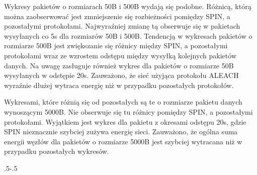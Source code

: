 Wykresy pakietów o rozmiarach 50B i 500B wydają się podobne. Różnicą, którą można zaobserwować jest zmniejszenie się rozbieżności pomiędzy SPIN, a pozostałymi protokołami. Najwyraźniej zmianę tą obserwuje się w pakietach wysyłanych co 5s dla rozmiarów 50B i 500B. Tendencją w wykresach pakietów o rozmiarze 500B jest zwiększanie się różnicy między SPIN, a pozostałymi protokołami wraz ze wzrostem odstępu między wysyłką kolejnych pakietów danych. Na uwagę zasługuje również wykres dla pakietów o rozmiarze 50B wysyłanych w odstępie 20s. Zauważono, że sieć użyjąca protokołu ALEACH wyraźnie dłużej wytraca energię niż w przypadku pozostałych protokołów. 

Wykresami, które różnią się od pozostałych są te o rozmiarze pakietu danych wynoszącym 5000B. Nie obserwuje się tu różnicy pomiędzy SPIN, a pozostałymi protokołami. Wyjątkiem jest wykres dla pakietu z okresami odstępu 20s, gdzie SPIN nieznacznie szybciej zużywa energię sieci. Zauważono, że ogólna suma energii węzłów dla pakietów o rozmiarze 5000B jest szybciej wytracana niż w przypadku pozostałych wykresów.

\clearpage
\thispagestyle{empty}

{\pdfpagewidth
    \vspace*{-2cm}
    \noindent\kern.5\pdfpagewidth{}\kern-.5\pdfpagewidth
     \par
     \vspace*{-5cm}
\clearpage
}


